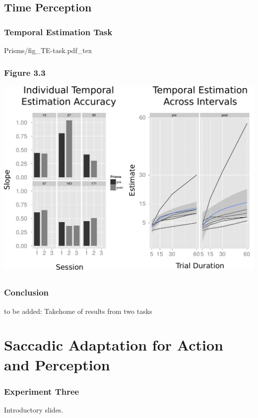 \documentclass{beamer}
\begin{document}
\subsection*{Time Perception}
\begin{frame}
	\frametitle{Temporal Estimation Task}
	\def\svgwidth{0.9\textwidth}
	{Prisms/fig_TE-task.pdf_tex}
\end{frame}




\subsection*{}
\begin{frame}
	\frametitle{Conclusion}
	to be added: Takehome of results from two tasks
\end{frame}


\section[Saccadic Adaptation]{Saccadic Adaptation for Action and Perception}

\begin{frame}
	\frametitle{Experiment Three}
	Introductory slides.
\end{frame}
\end{document}
